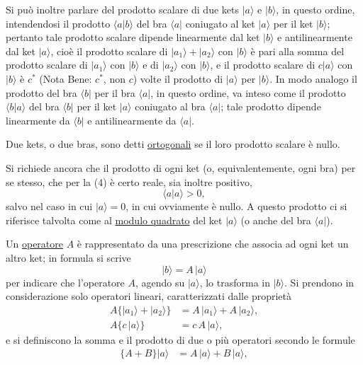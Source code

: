 \documentclass[11pt, a4paper]{book}
\numberwithin{equation}{section}
\begin{document}

Si può inoltre parlare del prodotto scalare di due kets $|a\rangle$ e
$|b\rangle$, in questo ordine, intendendosi il prodotto $\langle a|b\rangle$
del bra $\langle a|$ coniugato al ket $|a\rangle$ per il ket $|b\rangle$;
pertanto tale prodotto scalare dipende linearmente dal ket $|b\rangle$ e
antilinearmente dal ket $|a\rangle$, cioè il prodotto scalare di
$|a_1\rangle+|a_2\rangle$ con $|b\rangle$ è pari alla somma del prodotto
scalare di $|a_1\rangle$ con $|b\rangle$ e di $|a_2\rangle$ con
$|b\rangle$, e il prodotto scalare di $c|a\rangle$ con $|b\rangle$ è
$c^*$ (Nota Bene: $c^*$, non $c$) volte il prodotto di $|a\rangle$ per
$|b\rangle$. In modo analogo il prodotto del bra $\langle b|$ per il bra
$\langle a|$, in questo ordine, va inteso come il prodotto $\langle b|a\rangle$
del bra $\langle b|$ per il ket $|a\rangle$ coniugato al bra $\langle a|$;
tale prodotto dipende linearmente da $\langle b|$ e antilinearmente da
$\langle a|$.

Due kets, o due bras, sono detti \underline{ortogonali} se il loro
prodotto scalare è nullo.

Si richiede ancora che il prodotto di ogni ket (o, equivalentemente,
ogni bra) per se stesso, che per la (4) è certo reale, sia inoltre
positivo,
\begin{equation}
\langle a|a\rangle > 0,
\end{equation}
salvo nel caso in cui $|a\rangle = 0$, in cui ovviamente è nullo. A
questo prodotto ci si riferisce talvolta come al \underline{modulo
quadrato} del ket $|a\rangle$ (o anche del bra $\langle a|$).

Un \underline{operatore} $A$ è rappresentato da una prescrizione che
associa ad ogni ket un altro ket; in formula si scrive
\begin{equation}
|b\rangle = A\,|a\rangle
\end{equation}
per indicare che l'operatore $A$, agendo su $|a\rangle$, lo trasforma in
$|b\rangle$. Si prendono in considerazione solo operatori lineari,
caratterizzati dalle proprietà
\begin{align}
A\bigl\{|a_1\rangle+|a_2\rangle\bigr\} &= A\,|a_1\rangle+A\,|a_2\rangle, \tag{9a} \\
A\bigl\{c\,|a\rangle\bigr\} &= c\,A\,|a\rangle, \tag{9b}
\end{align}
e si definiscono la somma e il prodotto di due o più operatori secondo
le formule
\begin{align}
\bigl\{A+B\bigr\}|a\rangle &= A\,|a\rangle + B\,|a\rangle, \tag{10}
\end{align}
\end{document}
